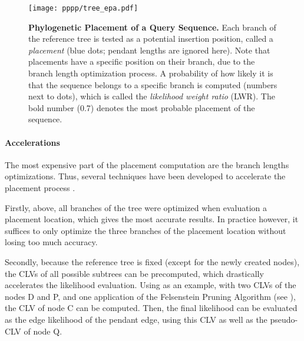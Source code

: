 \begin{figure}[hpbt]
    \centering
    \texttt{[image: pppp/tree\_epa.pdf]}
    \caption[Phylogenetic Placement of a Query Sequence]{
        \textbf{Phylogenetic Placement of a Query Sequence.}
        Each branch of the reference tree is tested as a potential insertion position, called a \emph{placement}
        (blue dots; pendant lengths are ignored here).
        Note that placements have a specific position on their branch, due to the branch length optimization process.
        A probability of how likely it is that the sequence belongs to a specific branch is computed
        (numbers next to dots),
        which is called the \emph{likelihood weight ratio} (LWR).
        The bold number (0.7) denotes the most probable placement of the sequence.
    }
    \label{fig:tree_epa}
\end{figure}

\paragraph{Accelerations}
\label{ch:Foundations:sec:PhylogeneticPlacement:sub:PipelineAndComputation:par:Accelerations}

The most expensive part of the placement computation are the branch lengths optimizations.
Thus, several techniques have been developed to accelerate the placement process \cite{Barbera2018}.

Firstly, above, all branches of the tree were optimized when evaluation a placement location,
which gives the most accurate results.
In practice however, it suffices to only optimize the three branches of the placement location
without losing too much accuracy.

Secondly, because the reference tree is fixed (except for the newly created nodes),
the CLVs of all possible subtrees can be precomputed,
which drastically accelerates the likelihood evaluation.
Using  as an example,
with two CLVs of the nodes {\sffamily D} and {\sffamily P}, and one application of the Felsenstein Pruning Algorithm
(see ),
the CLV of node {\sffamily C} can be computed.
Then, the final likelihood can be evaluated as the edge likelihood of the pendant edge,
using this CLV as well as the pseudo-CLV of node {\sffamily Q}.

